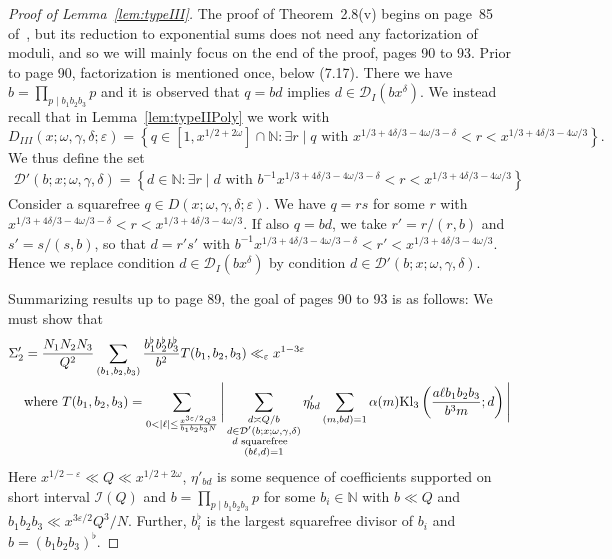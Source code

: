 \documentclass{amsart}
\numberwithin{equation}{section}
\begin{document}
\begin{proof}[Proof of Lemma~\ref{lem:typeIII}]
The proof of Theorem~2.8(v)  begins on page~85 of~\cite{Polymath:2014:EDZ}, but its reduction to exponential sums does not need any factorization of moduli, and so we will mainly focus on the end of the proof, pages 90 to 93. 
Prior to page 90, factorization is mentioned once, below (7.17). There we have $b= \prod_{p \mid b_1b_2b_3} p$ and it is observed that $q=bd$ implies $d \in \mathcal{D}_I(bx^\delta)$. We instead recall that in Lemma~\ref{lem:typeIIPoly} we work with  $$D_{III}(x;\omega,\gamma,\delta;\varepsilon) = \left\{q \in  [1, x^{1/2+2\omega}]\cap \mathbb{N}:  \exists r \mid q \mbox{ with } x^{1/3+4\delta/3 -4\omega/3-\delta} < r < x^{1/3+4\delta/3 -4\omega/3} \right\}.$$
We thus define the set
\begin{align*}
\mathcal{D}'(b;x;\omega,\gamma,\delta) =\left\{d \in  \mathbb{N}:  \exists r \mid d \mbox{ with }  b^{-1} x^{1/3+4\delta/3 -4\omega/3-\delta} < r < x^{1/3+4\delta/3 -4\omega/3} \right\}
\end{align*}
Consider a squarefree $q \in D(x;\omega,\gamma,\delta;\varepsilon)$. We   have $q=rs$  for some $r$ with $ x^{1/3+4\delta/3 -4\omega/3-\delta} < r < x^{1/3+4\delta/3 -4\omega/3}$. If  also $q=bd$, we   take $r'=r/(r,b)$ and $s'=s/(s,b)$, so that $d= r' s'$ with $ b^{-1}x^{1/3+4\delta/3 -4\omega/3-\delta} < r' < x^{1/3+4\delta/3 -4\omega/3}$. Hence we replace  condition $d \in \mathcal{D}_I(bx^\delta)$ by condition $d \in \mathcal{D}'(b;x;\omega,\gamma,\delta)$.

\medskip Summarizing results up to page 89,  the goal of pages 90 to 93  is as follows: We must show that
\begin{align}\label{inequ:thm28aim}
\Sigma'_2&=\frac{N_1N_2N_3}{Q^2} \sum_{(b_1,b_2,b_3)} \frac{b_1^\flat b_2^\flat b_3^\flat}{b^2} T(b_1,b_2,b_3) \ll_\varepsilon x^{1-3\varepsilon}   \\
&\mbox{where } T(b_1,b_2,b_3) = \sum_{0 < |\ell|\leq  \frac{x^{3\varepsilon/2} Q^3}{b_1b_2b_3 N}}  
 \Bigg|\sum_{\substack{d \asymp Q/b \\ d\in \mathcal{D}'(b;x;\omega,\gamma,\delta) \\ d \mbox{\begin{scriptsize}
 squarefree \end{scriptsize}   }   \\(b\ell,d)=1}} \eta'_{bd} \sum_{(m,bd)=1} \alpha(m)  \mbox{Kl}_3\left(\frac{a\ell b_1b_2b_3}{b^3m};d \right) \Bigg|
\nonumber
\end{align}
Here $x^{1/2-\varepsilon} \ll Q \ll x^{1/2+2\omega}$,  $\eta'_{bd}$ is some sequence of coefficients supported on short interval $\mathcal{I}(Q)$ and $b= \prod_{p \mid b_1b_2b_3} p$ for some $b_i \in \mathbb{N}$ with $b \ll Q$ and $b_1b_2b_3 \ll x^{3\varepsilon/2} Q^3/N$. Further, $b_i^\flat$ is the largest squarefree divisor of $b_i$ and $b= (b_1b_2b_3)^\flat$. 


\end{proof}
\end{document}
